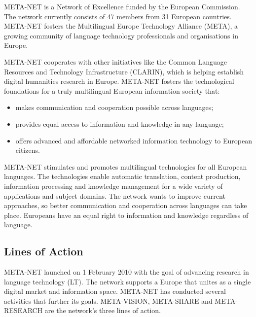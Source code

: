 \documentclass[]{../../metanetpaper}
\begin{document}
\clearpage
{}
\begin{multicols}{2}

META-NET is a Network of Excellence funded by the European
Commission. The network currently consists of 47 members from 31
European countries. META-NET fosters the Multilingual Europe
Technology Alliance (META), a growing community of language technology
professionals and organisations in Europe.


META-NET cooperates with other initiatives like the Common Language
Resources and Technology Infrastructure (CLARIN), which is helping
establish digital humanities research in Europe. META-NET fosters the
technological foundations for a truly multilingual European
information society that:
\begin{itemize}
\item makes communication and cooperation possible across languages;

\item provides equal access to information and knowledge in any language;

\item offers advanced and affordable networked information technology to European
    citizens.
\end{itemize}
META-NET stimulates and promotes multilingual technologies for all
European languages. The technologies enable automatic translation,
content production, information processing and knowledge management
for a wide variety of applications and subject domains. The network
wants to improve current approaches, so better communication and
cooperation across languages can take place. Europeans have an equal
right to information and knowledge regardless of language.

\subsection{Lines of Action}

META-NET launched on 1 February 2010 with the goal of advancing
research in language technology (LT). The network supports a Europe
that unites as a single digital market and information space. META-NET
has conducted several activities that further its goals. META-VISION,
META-SHARE and META-RESEARCH are the network’s three lines of action.


\end{multicols}
\end{document}

